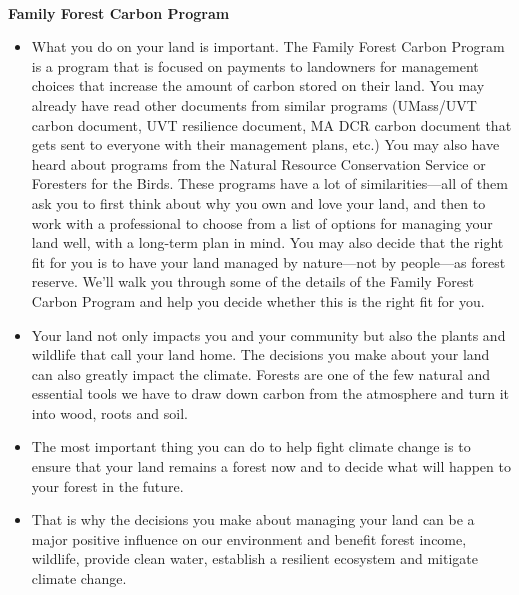 \documentclass{article}\usepackage[]{graphicx}\usepackage[]{color}
\begin{document}
\vspace{3ex}\\
{\Large{\textbf{Family Forest Carbon Program}}}
  \begin{itemize}
  
  \item What you do on your land is important.  The Family Forest Carbon Program is a program that is focused on payments to landowners for management choices that increase the amount of carbon stored on their land. You may already have read other documents from similar programs (UMass/UVT carbon document, UVT resilience document, MA DCR carbon document that gets sent to everyone with their management plans, etc.) You may also have heard about programs from the Natural Resource Conservation Service or Foresters for the Birds. These programs have a lot of similarities---all of them ask you to first think about why you own and love your land, and then to work with a professional to choose from a list of options for managing your land well, with a long-term plan in mind. You may also decide that the right fit for you is to have your land managed by nature---not by people---as forest reserve. We'll walk you through some of the details of the Family Forest Carbon Program and help you decide whether this is the right fit for you.
  
  \item Your land not only impacts you and your community but also the plants and wildlife that call your land home. The decisions you make about your land can also greatly impact the climate. Forests are one of the few natural and essential tools we have to draw down carbon from the atmosphere and turn it into wood, roots and soil.
  \item  The most important thing you can do to help fight climate change is to ensure that your land remains a forest now and to decide what will happen to your forest in the future.
  \item That is why the decisions you make about managing your land can be a major positive influence on our environment and benefit forest income, wildlife, provide clean water, establish a resilient ecosystem and mitigate climate change.   
  \end{itemize}
\end{document}
